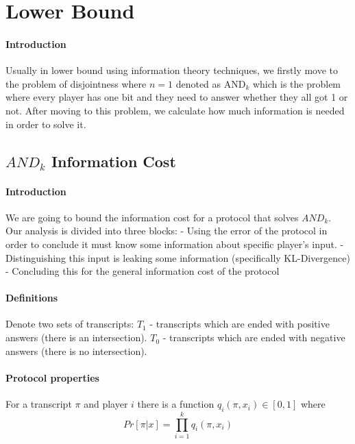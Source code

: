 \section{Lower Bound}
\paragraph{Introduction}
Usually in lower bound using information theory techniques, we firstly move to the problem of disjointness where $n=1$ denoted as $\text{AND}_k$ which is the problem where every player has one bit and they need to answer whether they all got 1 or not. After moving to this problem, we calculate how much information is needed in order to solve it.
\subsection{$AND_k$ Information Cost}
\paragraph{Introduction}
We are going to bound the information cost for a protocol that solves $AND_k$. Our analysis is divided into three blocks:  - Using the error of the protocol in order to conclude it must know some information about specific player's input.  - Distinguishing this input is leaking some information (specifically KL-Divergence)  - Concluding this for the general information cost of the protocol \newline
\paragraph{Definitions}
\begin{definition}
    Denote two sets of transcripts: \newline
    $T_1$ - transcripts which are ended with positive answers (there is an intersection). \newline
    $T_0$ - transcripts which are ended with negative answers (there is no intersection).
\end{definition}

\paragraph{Protocol properties}
For a transcript $\pi$ and player $i$ there is a function $q_i(\pi, x_i) \in [0,1]$ where
\begin{equation*}
    Pr[\pi | x] = \prod_{i=1}^{k}q_i(\pi, x_i )
\end{equation*}

